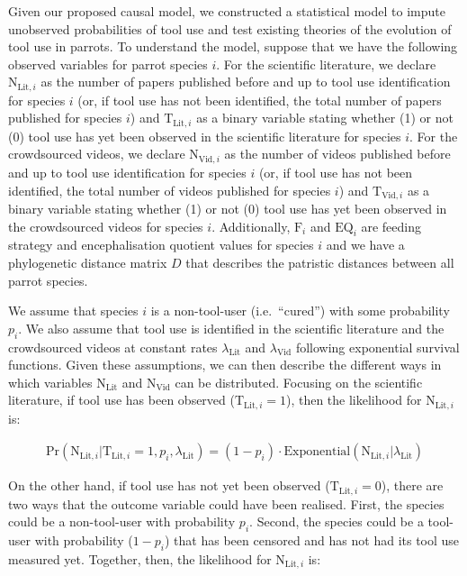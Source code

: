 \documentclass[
  man,floatsintext]{apa6}
\begin{document}
Given our proposed causal model, we constructed a statistical model to impute unobserved probabilities of tool use and test existing theories of the evolution of tool use in parrots. To understand the model, suppose that we have the following observed variables for parrot species \(i\). For the scientific literature, we declare \(\text{N}_{\text{Lit},i}\) as the number of papers published before and up to tool use identification for species \(i\) (or, if tool use has not been identified, the total number of papers published for species \(i\)) and \(\text{T}_{\text{Lit},i}\) as a binary variable stating whether (1) or not (0) tool use has yet been observed in the scientific literature for species \(i\). For the crowdsourced videos, we declare \(\text{N}_{\text{Vid},i}\) as the number of videos published before and up to tool use identification for species \(i\) (or, if tool use has not been identified, the total number of videos published for species \(i\)) and \(\text{T}_{\text{Vid},i}\) as a binary variable stating whether (1) or not (0) tool use has yet been observed in the crowdsourced videos for species \(i\). Additionally, \(\text{F}_i\) and \(\text{EQ}_i\) are feeding strategy and encephalisation quotient values for species \(i\) and we have a phylogenetic distance matrix \(D\) that describes the patristic distances between all parrot species.

We assume that species \(i\) is a non-tool-user (i.e.~``cured'') with some probability \(p_i\). We also assume that tool use is identified in the scientific literature and the crowdsourced videos at constant rates \(\lambda_{\text{Lit}}\) and \(\lambda_{\text{Vid}}\) following exponential survival functions. Given these assumptions, we can then describe the different ways in which variables \(\text{N}_\text{Lit}\) and \(\text{N}_\text{Vid}\) can be distributed. Focusing on the scientific literature, if tool use has been observed (\(\text{T}_{\text{Lit},i} = 1\)), then the likelihood for \(\text{N}_{\text{Lit},i}\) is:

\begin{align}
\text{Pr}(\text{N}_{\text{Lit},i}|\text{T}_{\text{Lit},i} = 1,p_i,\lambda_\text{Lit}) = (1-p_i)\cdot\text{Exponential}(\text{N}_{\text{Lit},i}|\lambda_\text{Lit})
\end{align}

On the other hand, if tool use has not yet been observed (\(\text{T}_{\text{Lit},i} = 0\)), there are two ways that the outcome variable could have been realised. First, the species could be a non-tool-user with probability \(p_i\). Second, the species could be a tool-user with probability (\(1 - p_i\)) that has been censored and has not had its tool use measured yet. Together, then, the likelihood for \(\text{N}_{\text{Lit},i}\) is:
\end{document}
